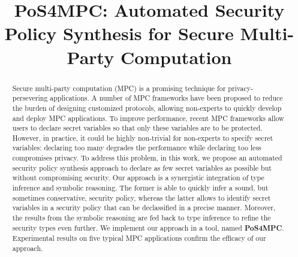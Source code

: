 \documentclass[runningheads]{llncs}
\newcommand{\TNAME}{\textbf{PoS4MPC}\xspace}
\begin{document}
\title{\TNAME: Automated Security Policy Synthesis for Secure Multi-Party Computation}

\author{}
\institute{}%
%
\maketitle              %


\begin{abstract}
Secure multi-party computation (MPC) is a promising technique for privacy-persevering applications.
A number of MPC frameworks have been proposed to reduce the burden of designing customized protocols, allowing non-experts to quickly develop and deploy MPC applications.
To improve performance, recent MPC frameworks allow users to declare secret variables so that only these variables are to be protected. However, in practice, it could be highly non-trivial for non-experts to
specify secret variables: declaring too many degrades the performance while declaring too less compromises privacy.
%
To address this problem, in this work, we propose an automated security policy synthesis approach to declare as few secret variables as possible but without compromising security. Our approach is a synergistic integration of type inference and symbolic reasoning. The former is able to quickly infer a sound, but sometimes conservative, security policy, whereas the latter allows to identify secret variables in a security policy that can be declassified in a precise manner. %
Moreover, the results from the symbolic reasoning are fed back to type inference to refine the security types even further.
%
We implement our approach in a tool, named \TNAME.
Experimental results on five typical MPC applications confirm the efficacy of our approach.
\end{abstract}
\end{document}
